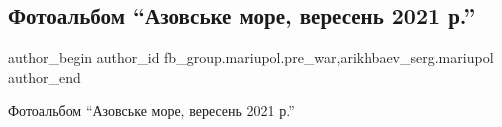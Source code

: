  
 
 
 
 

\subsection{Фотоальбом \enquote{Азовське море, вересень 2021 р.}}
\label{sec:05_03_2023.fb.fb_group.mariupol.pre_war.2.fotoalbom__azovske_m}
 
\ifcmt
 author_begin
   author_id fb_group.mariupol.pre_war,arikhbaev_serg.mariupol
 author_end
\fi

Фотоальбом \enquote{Азовське море, вересень 2021 р.}

